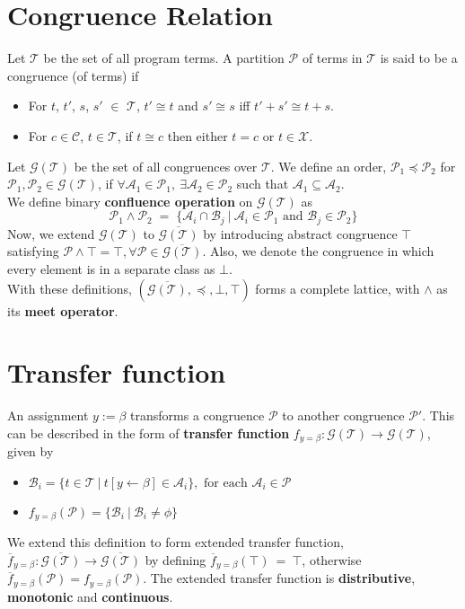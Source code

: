 \section{Congruence Relation}
\label{CongruenceRelation}
Let $\mathcal T$ be the set of all program terms. A partition $\mathcal P$ of terms 
in $\mathcal T$ is said to be a congruence (of terms) if 
\begin{itemize}
    \item For $t$, $t'$, $s$, $s'$ $\in$ $\mathcal T$, $t' \cong t$ and $s' \cong s$ iff $t' + s' \cong t + s$. 
    \item For $c \in \mathcal C$, $t \in \mathcal T$, if $t \cong c$ then either $t = c$ or $t \in \mathcal X$.
\end{itemize}
Let $\mathcal G(\mathcal T)$ be the set of all congruences over $\mathcal T$. 
We define an order, $\mathcal P_1 \preceq \mathcal P_2$ for 
$\mathcal P_1, \mathcal P_2 \in \mathcal G(\mathcal T)$, if 
$\forall \mathcal A_1 \in \mathcal P_1, \ \exists \mathcal A_2 \in \mathcal P_2$ 
such that $\mathcal A_1 \subseteq \mathcal A_2$. \\
We define binary \textbf{confluence operation} on $\mathcal G(\mathcal T)$ as 
$$\mathcal P_1 \land \mathcal P_2\; =\; \{\mathcal A_i \cap \mathcal B_j\: |\: \mathcal A_i \in \mathcal P_1 \text{ and } \mathcal B_j \in \mathcal P_2\}$$
Now, we extend $\mathcal G(\mathcal T)$ to $\overline{\mathcal G(\mathcal T)}$ 
by introducing abstract congruence $\top$ satisfying 
$\mathcal P \land \top = \top, \forall \mathcal P \in \overline{\mathcal G(\mathcal T)}$.
Also, we denote the congruence in which every element is in a separate class as 
$\bot$. \\ With these definitions, 
$(\overline{\mathcal G(\mathcal T)}, \preceq, \bot, \top)$ 
forms a complete lattice, with $\land$ as its \textbf{meet operator}.

\section{Transfer function}
\label{sec:TransferFunction}
An assignment $y := \beta$ transforms a congruence $\mathcal P$ to another 
congruence $\mathcal P'$. This can be described in the form of \textbf{transfer function} 
$f_{y = \beta}:\mathcal G(\mathcal T) \to \mathcal G(\mathcal T)$, given by
\begin{itemize}
    \item $\mathcal B_i = \{t \in \mathcal T\ |\ t[y \leftarrow \beta] \in \mathcal A_i\}, \text{ for each } \mathcal A_i \in \mathcal P$
    \item $f_{y = \beta}(\mathcal P) = \{\mathcal B_i\ | \ \mathcal B_i \neq \phi\}$
\end{itemize}
We extend this definition to form extended transfer function, 
$\overline{f}_{y=\beta} : \overline{\mathcal G(\mathcal T)} \to \overline{\mathcal G(\mathcal T)}$ 
by defining $\overline{f}_{y=\beta}(\top)\ =\ \top$, otherwise 
$\overline{f}_{y=\beta}(\mathcal P) = f_{y=\beta}(\mathcal P)$.
The extended transfer function is \textbf{distributive}, \textbf{monotonic} and 
\textbf{continuous}.


